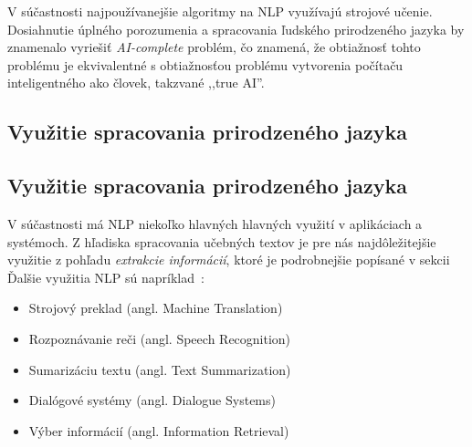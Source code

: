 V súčastnosti najpoužívanejšie algoritmy na NLP využívajú strojové učenie. Dosiahnutie úplného porozumenia a spracovania ľudského prirodzeného jazyka by znamenalo vyriešiť \textit{AI-complete} problém, čo znamená, že obtiažnosť tohto problému je ekvivalentné s obtiažnosťou problému vytvorenia počítaču inteligentného ako človek, takzvané ,,true AI''.

%
%
{
	\subsection{Využitie spracovania prirodzeného jazyka}
}
{
	\subsection{Využitie spracovania prirodzeného jazyka}
}
\label{subsec:useofnlp}
V súčastnosti má NLP niekoľko hlavných hlavných využití v aplikáciach a systémoch. Z hľadiska spracovania učebných textov je pre nás najdôležitejšie využitie z pohľadu \textit{extrakcie informácií}, ktoré je podrobnejšie popísané v sekcii  Ďalšie využitia NLP sú napríklad~\cite{Preeti}:
\begin{itemize}
	\item Strojový preklad (angl. Machine Translation)
	\item Rozpoznávanie reči (angl. Speech Recognition)
	\item Sumarizáciu textu (angl. Text Summarization)
	\item Dialógové systémy (angl. Dialogue Systems)
	\item Výber informácií (angl. Information Retrieval)
\end{itemize}

